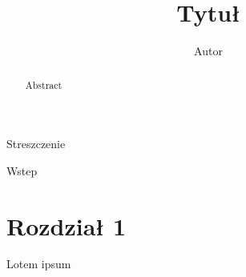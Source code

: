\documentclass[oik, pdftex, robocza, man]{mgrwms}
\begin{document}
\title{ \LARGE Tytuł}
\author{Autor}
\maketitle

\newtheorem{thm}{\indent Twierdzenie}[chapter]
\newtheorem{lemma}[thm]{\indent Lemat}
\newtheorem{cor}[thm]{\indent Wniosek}
\newtheorem{obs}[thm]{\indent Obserwacja}
\newtheorem{uw}[thm]{\indent Uwaga}
\newtheorem{df}[thm]{Definicja}
\newcommand{\E}{\mathbb{E}}
\newcommand{\R}{\mathbb{R}}
\newcommand{\Pra}{\mathbb{Pra}}

\makeatletter
\newcommand*{\defeq}{\mathrel{\rlap{%
                     \raisebox{0.3ex}{$\m@th\cdot$}}%
                     \raisebox{-0.3ex}{$\m@th\cdot$}}%
                     =}
\let\c@table\c@figure
\makeatother

% 

\tableofcontents

\begin{streszczenie}
    Streszczenie
\end{streszczenie}


\begin{abstract}
    Abstract
\end{abstract}



\begin{wstep}    %
    Wstep
\end{wstep}


\chapter{Rozdział 1}

Lotem ipsum

\mgrclosechapter




%  
\begin{thebibliography}{88}
\end{thebibliography}
\end{document}
